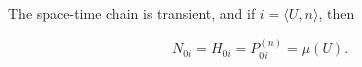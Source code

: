 The space-time chain is transient, and if $i = \langle U, n \rangle$, then

$$N_{0i} = H_{0i} = P_{0i}^{(n)} = \mu(U).$$
